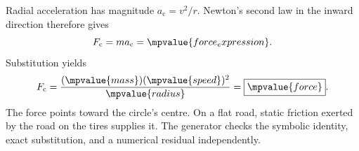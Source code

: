 Radial acceleration has magnitude $a_{\mathrm c}=v^2/r$. Newton's second law in the inward
direction therefore gives
\[
  F_{\mathrm c}=ma_{\mathrm c}=\mpvalue{force_expression}.
\]
Substitution yields
\[
  F_{\mathrm c}
  =\frac{(\mpvalue{mass})(\mpvalue{speed})^2}{\mpvalue{radius}}
  =\boxed{\mpvalue{force}}.
\]
The force points toward the circle's centre. On a flat road, static friction exerted by the road
on the tires supplies it. The generator checks the symbolic identity, exact substitution, and a
numerical residual independently.
